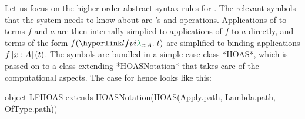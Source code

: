 \begin{example}
	Let us focus on the higher-order abstract syntax rules for \LF. The relevant symbols that the system needs to know about are \LF's  and  operations. Applications of  to terms $f$ and $a$ are then internally simplied to applications of $f$ to $a$ directly, and terms of the form $f(\lflambda{x:A}t)$ are simplified to binding applications $f\left[x:A\right]\left(t\right)$. The symbols are bundled in a simple case class *HOAS*, which is passed on to a class extending *HOASNotation* that takes care of the computational aspects. The case for \LF hence looks like this:
\begin{scalacode}
object LFHOAS extends HOASNotation(HOAS(Apply.path, Lambda.path, OfType.path))
\end{scalacode}
\end{example}

